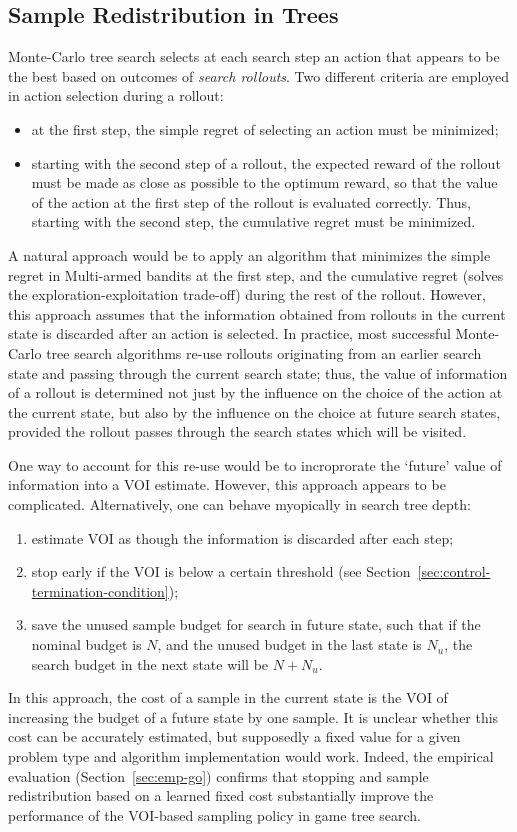 \documentclass{article}
\begin{document}
\subsection{Sample Redistribution in Trees}

Monte-Carlo tree search \cite{Chaslot.montecarlo} selects at each
search step an action that appears to be the best based on outcomes
of \textit{search rollouts}. Two different criteria are employed in
action selection during a rollout:
\begin{itemize}
\item at the first step, the simple regret of selecting an action
must be minimized;
\item starting with the second step of a rollout, the expected reward
of the rollout
 must be made as close as possible to the optimum reward, so that the
 value of the action at the first step of the rollout is evaluated
 correctly. Thus, starting with the second step, the cumulative regret
 must be minimized.
\end{itemize}

A natural approach would be to apply an algorithm that minimizes the
simple regret in Multi-armed bandits at the first step, and the
cumulative regret (solves the exploration-exploitation trade-off)
during the rest of the rollout.  However, this approach assumes that
the information obtained from rollouts in the current state is
discarded after an action is selected. In practice, most successful
Monte-Carlo tree search algorithms re-use rollouts originating from an
earlier search state and passing through the current search state;
thus, the value of information of a rollout is determined not just by
the influence on the choice of the action at the current state, but
also by the influence on the choice at future search states, provided
the rollout passes through the search states which will be visited.

One way to account for this re-use would be to incroprorate the
`future' value of information into a VOI estimate. However, this 
approach appears to be complicated. Alternatively, one can behave
myopically in search tree depth:
\begin{enumerate}
\item estimate VOI as though the information is discarded after each step;
\item stop early if the VOI is below a certain threshold
   (see Section~\ref{sec:control-termination-condition});
\item save the unused sample budget for search in future state, such that
   if the nominal budget is $N$, and the unused budget in the last state
   is $N_u$, the search budget in the next state will be $N+N_u$.
\end{enumerate}
In this approach, the cost of a sample in the current state is the
VOI of increasing the budget of a future state by one sample.  It is
unclear whether this cost can be accurately estimated, but supposedly
a fixed value for a given problem type and algorithm implementation
would work. Indeed, the empirical evaluation (Section~\ref{sec:emp-go})
confirms that stopping and sample redistribution based on a learned
fixed cost  substantially improve the performance of the VOI-based
sampling policy in game tree search.
\end{document}
